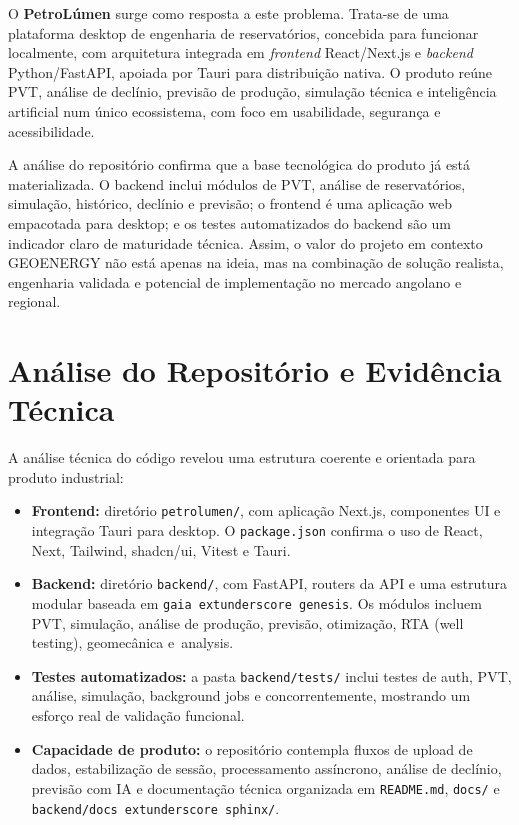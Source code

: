 \documentclass[11pt,a4paper]{article}
\begin{document}
O \textbf{PetroLúmen} surge como resposta a este problema. Trata-se de uma plataforma desktop de engenharia de reservatórios, concebida para funcionar localmente, com arquitetura integrada em \textit{frontend} React/Next.js e \textit{backend} Python/FastAPI, apoiada por Tauri para distribuição nativa. O produto reúne PVT, análise de declínio, previsão de produção, simulação técnica e inteligência artificial num único ecossistema, com foco em usabilidade, segurança e acessibilidade.

A análise do repositório confirma que a base tecnológica do produto já está materializada. O backend inclui módulos de PVT, análise de reservatórios, simulação, histórico, declínio e previsão; o frontend é uma aplicação web empacotada para desktop; e os testes automatizados do backend são um indicador claro de maturidade técnica. Assim, o valor do projeto em contexto GEOENERGY não está apenas na ideia, mas na combinação de solução realista, engenharia validada e potencial de implementação no mercado angolano e regional.

\section{Análise do Repositório e Evidência Técnica}
A análise técnica do código revelou uma estrutura coerente e orientada para produto industrial:

\begin{itemize}
    \item \textbf{Frontend:} diretório \texttt{petrolumen/}, com aplicação Next.js, componentes UI e integração Tauri para desktop. O \texttt{package.json} confirma o uso de React, Next, Tailwind, shadcn/ui, Vitest e Tauri.
    \item \textbf{Backend:} diretório \texttt{backend/}, com FastAPI, routers da API e uma estrutura modular baseada em \texttt{gaia	extunderscore genesis}. Os módulos incluem PVT, simulação, análise de produção, previsão, otimização, RTA (well testing), geomecânica e\ analysis.
    \item \textbf{Testes automatizados:} a pasta \texttt{backend/tests/} inclui testes de auth, PVT, análise, simulação, background jobs e concorrentemente, mostrando um esforço real de validação funcional.
    \item \textbf{Capacidade de produto:} o repositório contempla fluxos de upload de dados, estabilização de sessão, processamento assíncrono, análise de declínio, previsão com IA e documentação técnica organizada em \texttt{README.md}, \texttt{docs/} e \texttt{backend/docs	extunderscore sphinx/}.
\end{itemize}
\end{document}
